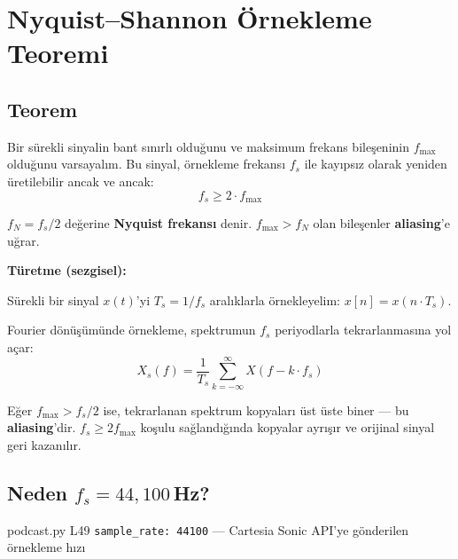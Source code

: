 \section{Nyquist--Shannon \"{O}rnekleme Teoremi}
\label{sec:nyquist}

\subsection{Teorem}

\begin{formulbox}
Bir s\"{u}rekli sinyalin bant s{\i}n{\i}rl{\i} oldu\u{g}unu ve maksimum frekans bile\c{s}eninin $f_{\max}$ oldu\u{g}unu varsayal{\i}m. Bu sinyal, \"{o}rnekleme frekans{\i} $f_s$ ile kay{\i}ps{\i}z olarak yeniden \"{u}retilebilir ancak ve ancak:
\begin{equation}
\label{eq:nyquist}
f_s \geq 2 \cdot f_{\max}
\end{equation}

$f_N = f_s / 2$ de\u{g}erine \textbf{Nyquist frekans{\i}} denir. $f_{\max} > f_N$ olan bile\c{s}enler \textbf{aliasing}'e u\u{g}rar.
\end{formulbox}

\textbf{T\"{u}retme (sezgisel):}

S\"{u}rekli bir sinyal $x(t)$'yi $T_s = 1/f_s$ aral{\i}klarla \"{o}rnekleyelim: $x[n] = x(n \cdot T_s)$.

Fourier d\"{o}n\"{u}\c{s}\"{u}m\"{u}nde \"{o}rnekleme, spektrumun $f_s$ periyodlarla tekrarlanmas{\i}na yol a\c{c}ar:
\begin{equation}
\label{eq:sampling_spectrum}
X_s(f) = \frac{1}{T_s} \sum_{k=-\infty}^{\infty} X(f - k \cdot f_s)
\end{equation}

E\u{g}er $f_{\max} > f_s/2$ ise, tekrarlanan spektrum kopyalar{\i} \"{u}st \"{u}ste biner --- bu \textbf{aliasing}'dir. $f_s \geq 2 f_{\max}$ ko\c{s}ulu sa\u{g}land{\i}\u{g}{\i}nda kopyalar ayr{\i}\c{s}{\i}r ve orijinal sinyal geri kazan{\i}l{\i}r.

\subsection{Neden $f_s = 44{,}100$\,Hz?}

\begin{kodref}{podcast.py L49}
\texttt{sample\_rate: 44100} --- Cartesia Sonic API'ye g\"{o}nderilen \"{o}rnekleme h{\i}z{\i}
\end{kodref}

